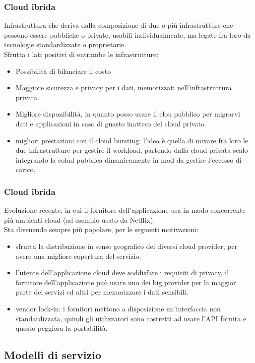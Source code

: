\documentclass{article}
\begin{document}
\subsubsection{Cloud ibrida}
Infrastruttura che deriva dalla composizione di due o più infrastrutture che possono essere pubbliche o private, usabili individualmente, ma legate fra loro da tecnologie standardizzate o proprietarie.\\ Sfrutta i lati positivi di entrambe le infrastrutture:
\begin{itemize}
\item Possibilità di bilanciare il costo
\item Maggiore sicurezza e privacy per i dati, memorizzati nell'infrastruttura privata.
\item Migliore disponibilità, in quanto posso usare il clou pubblico per migrarvi dati e applicazioni in caso di guasto inatteso del cloud privato.
\item migliori prestazioni con il cloud bursting: l'idea è quella di mixare fra loro le due infrastrutture per gestire il workload, partendo dalla cloud privata scalo integrando la colud pubblica dinamicamente in mod da gestire l'eccesso di carico. 
\end{itemize}
\subsubsection{Cloud ibrida}
Evoluzione recente, in cui il fornitore dell'applicazione usa in modo concorrente più ambienti cloud (ad esempio usato da Netflix). \\Sta divenendo sempre più popolare, per le seguenti motivazioni:
\begin{itemize}
\item sfrutta la distribuzione in senso geografico dei diversi cloud provider, per avere una migliore copertura del servizio.
\item l'utente dell'applicazione cloud deve soddisfare i requisiti di privacy, il fornitore dell'applicazione può usare uno dei big provider per la maggior parte dei servizi ed altri per memorizzare i dati sensibili.
\item vendor lock-in: i fornitori mettono a disposizione un'interfaccia non standardizzata, quindi gli utilizzatori sono costretti ad usare l'API fornita e questo peggiora la portabilità.
\end{itemize}
\subsection{Modelli di servizio}
\end{document}
